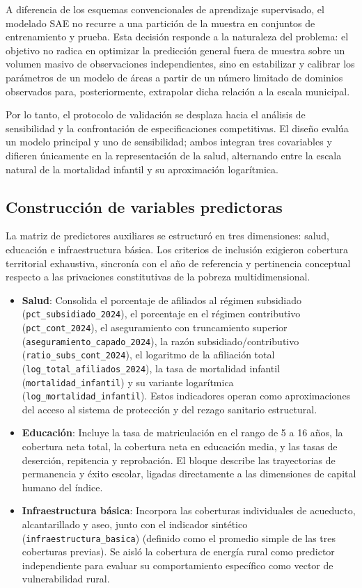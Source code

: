 A diferencia de los esquemas convencionales de aprendizaje supervisado, el modelado SAE no recurre a una partición de la muestra en conjuntos de entrenamiento y prueba. Esta decisión responde a la naturaleza del problema: el objetivo no radica en optimizar la predicción general fuera de muestra sobre un volumen masivo de observaciones independientes, sino en estabilizar y calibrar los parámetros de un modelo de áreas a partir de un número limitado de dominios observados para, posteriormente, extrapolar dicha relación a la escala municipal. 

Por lo tanto, el protocolo de validación se desplaza hacia el análisis de sensibilidad y la confrontación de especificaciones competitivas. El diseño evalúa un modelo principal y uno de sensibilidad; ambos integran tres covariables y difieren únicamente en la representación de la salud, alternando entre la escala natural de la mortalidad infantil y su aproximación logarítmica.

\subsection{Construcción de variables predictoras}
La matriz de predictores auxiliares se estructuró en tres dimensiones: salud, educación e infraestructura básica. Los criterios de inclusión exigieron cobertura territorial exhaustiva, sincronía con el año de referencia y pertinencia conceptual respecto a las privaciones constitutivas de la pobreza multidimensional.

\begin{itemize}
    \item \textbf{Salud}: Consolida el porcentaje de afiliados al régimen subsidiado (\texttt{pct\_subsidiado\_2024}), el porcentaje en el régimen contributivo (\texttt{pct\_cont\_2024}), el aseguramiento con truncamiento superior (\texttt{aseguramiento\_capado\_2024}), la razón subsidiado/contributivo (\texttt{ratio\_subs\_cont\_2024}), el logaritmo de la afiliación total (\texttt{log\_total\_afiliados\_2024}), la tasa de mortalidad infantil (\texttt{mortalidad\_infantil}) y su variante logarítmica (\texttt{log\_mortalidad\_infantil}). Estos indicadores operan como aproximaciones del acceso al sistema de protección y del rezago sanitario estructural.

    
    \item \textbf{Educación}: Incluye la tasa de matriculación en el rango de 5 a 16 años, la cobertura neta total, la cobertura neta en educación media, y las tasas de deserción, repitencia y reprobación. El bloque describe las trayectorias de permanencia y éxito escolar, ligadas directamente a las dimensiones de capital humano del índice.
    
    \item \textbf{Infraestructura básica}: Incorpora las coberturas individuales de acueducto, alcantarillado y aseo, junto con el indicador sintético (\texttt{infraestructura\-\_basica}) (definido como el promedio simple de las tres coberturas previas). Se aisló la cobertura de energía rural como predictor independiente para evaluar su comportamiento específico como vector de vulnerabilidad rural.
\end{itemize}

